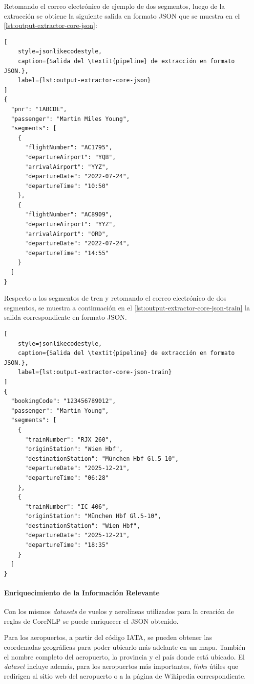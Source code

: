 Retomando el correo electrónico de ejemplo de dos segmentos, luego de la extracción se obtiene la siguiente salida en
formato JSON que se muestra en el \autoref{lst:output-extractor-core-json}:

\begin{lstlisting}[
    style=jsonlikecodestyle,
    caption={Salida del \textit{pipeline} de extracción en formato JSON.},
    label={lst:output-extractor-core-json}
]
{
  "pnr": "1ABCDE",
  "passenger": "Martin Miles Young",
  "segments": [
    {
      "flightNumber": "AC1795",
      "departureAirport": "YQB",
      "arrivalAirport": "YYZ",
      "departureDate": "2022-07-24",
      "departureTime": "10:50"
    },
    {
      "flightNumber": "AC8909",
      "departureAirport": "YYZ",
      "arrivalAirport": "ORD",
      "departureDate": "2022-07-24",
      "departureTime": "14:55"
    }
  ]
}
\end{lstlisting}

Respecto a los segmentos de tren y retomando el correo electrónico de dos segmentos, se muestra a continuación en el
\autoref{lst:output-extractor-core-json-train} la salida correspondiente en formato JSON\@.

\begin{lstlisting}[
    style=jsonlikecodestyle,
    caption={Salida del \textit{pipeline} de extracción en formato JSON.},
    label={lst:output-extractor-core-json-train}
]
{
  "bookingCode": "123456789012",
  "passenger": "Martin Young",
  "segments": [
    {
      "trainNumber": "RJX 260",
      "originStation": "Wien Hbf",
      "destinationStation": "München Hbf Gl.5-10",
      "departureDate": "2025-12-21",
      "departureTime": "06:28"
    },
    {
      "trainNumber": "IC 406",
      "originStation": "München Hbf Gl.5-10",
      "destinationStation": "Wien Hbf",
      "departureDate": "2025-12-21",
      "departureTime": "18:35"
    }
  ]
}
\end{lstlisting}

\paragraph{Enriquecimiento de la Información Relevante}

Con los mismos \textit{datasets} de vuelos y aerolíneas utilizados para la creación de reglas de CoreNLP se puede enriquecer el
JSON obtenido.

Para los aeropuertos, a partir del código IATA, se pueden obtener las coordenadas geográficas para poder ubicarlo más
adelante en un mapa.
También el nombre completo del aeropuerto, la provincia y el país donde está ubicado.
El \textit{dataset} incluye además, para los aeropuertos más importantes, \textit{links} útiles que redirigen al sitio
web del aeropuerto o a la página de Wikipedia correspondiente.

